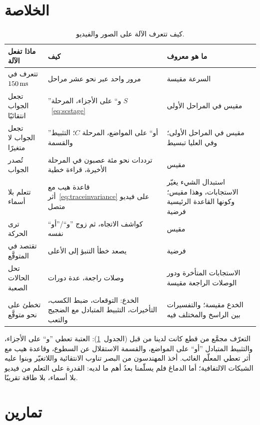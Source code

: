 \section{الخلاصة}

\begin{table}[t]
\centering
\footnotesize
\setlength{\tabcolsep}{4pt}
\renewcommand{\arraystretch}{1.15}
\begin{tabular}{>{\raggedright}p{3.0cm}>{\raggedright}p{4.6cm}>{\raggedright\arraybackslash}p{5.2cm}}
\toprule
ماذا تفعل الآلة & كيف & ما هو معروف \\
\midrule
تتعرف في $150\,\text{ms}$ & مرور واحد عبر نحو عشر مراحل & السرعة مقيسة \\
تجعل الجواب انتقائيًا & ”و“ على الأجزاء، المرحلة $S$~\eqref{eq:scstage} & مقيس في المراحل الأولى \\
تجعل الجواب لا متغيرًا & ”أو“ على المواضع، المرحلة $C$؛ التثبيط والقسمة & مقيس في المراحل الأولى؛ وفي العليا تبسيط \\
تُصدر الجواب & ترددات نحو مئة عصبون في المرحلة الأخيرة، قراءة خطية & مقيس \\
تتعلم بلا أسماء & قاعدة هيب مع أثر~\eqref{eq:traceinvariance} على فيديو متصل & استبدال الشيء يغيّر الاستجابات، وهذا مقيس؛ وكونها القاعدة الرئيسية فرضية \\
ترى الحركة & كواشف الاتجاه، ثم زوج ”و“/”أو“ نفسه & مقيس \\
تقتصد في المتوقَّع & يصعد خطأ التنبؤ إلى الأعلى & فرضية \\
تحل الحالات الصعبة & وصلات راجعة، عدة دورات & الاستجابات المتأخرة ودور الوصلات الراجعة مقيسة \\
تخطئ على نحو متوقَّع & الخدع: التوقعات، ضبط الكسب، التأخيرات، التثبيط المتبادل مع الضجيج والتعب & الخدع مقيسة؛ والتفسيرات بين الراسخ والمختلف فيه \\
\bottomrule
\end{tabular}
\caption{كيف تتعرف الآلة على الصور والفيديو.}
\label{tab:recognition}
\end{table}

التعرّف مجمَّع من قطع كانت لدينا من قبل (الجدول~\ref{tab:recognition}): العتبة تعطي ”و“ على الأجزاء، والتثبيط المتبادل ”أو“ على المواضع، والقسمة الاستقلال عن السطوع، وقاعدة هيب مع أثر تعطي المعلّم الغائب. أخذ المهندسون من البصر تناوب الانتقائية واللاتغيّر وبنوا عليه الشبكات الالتفافية؛ أما الدماغ فلم يسلّمنا بعدُ أهم ما لديه: القدرة على التعلم من فيديو بلا أسماء، بلا طاقة تقريبًا.

\section{تمارين}

